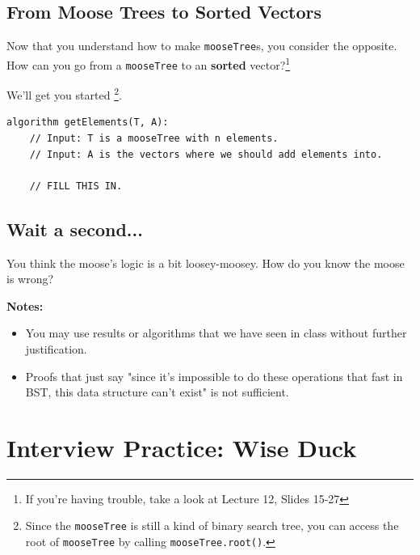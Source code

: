 \documentclass [12pt]{article}
\begin{document}

\subsection{From Moose Trees to Sorted Vectors }

Now that you understand how to make \texttt{mooseTree}s, you consider the opposite. How can you go from a \texttt{mooseTree} to an \textbf{sorted} vector?\footnote{If you're having trouble, take a look at Lecture 12, Slides 15-27}

We'll get you started \footnote{Since the \texttt{mooseTree} is still a kind of binary search tree, you can access the root of \texttt{mooseTree} by calling \texttt{mooseTree.root()}.}.
\begin{verbatim}
algorithm getElements(T, A):
    // Input: T is a mooseTree with n elements.
    // Input: A is the vectors where we should add elements into.

    // FILL THIS IN.
\end{verbatim}



\subsection{Wait a second... }
You think the moose's logic is a bit loosey-moosey. How do you know the moose is wrong? 

\textbf{Notes:} 
\begin{itemize}
    \item You may use results or algorithms that we have seen in class without further justification. 
    \item Proofs that just say "since it's impossible to do these operations that fast in BST, this data structure can't exist" is not sufficient. 
\end{itemize} 



\pagebreak
\section{Interview Practice: Wise Duck } 
\end{document}
